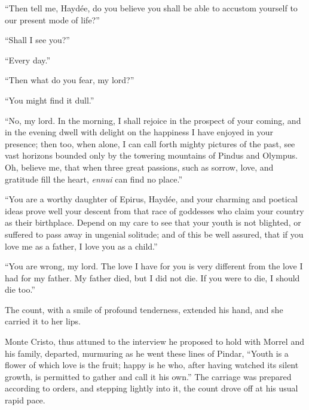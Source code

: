 “Then tell me, Haydée, do you believe you shall be able to accustom
yourself to our present mode of life?”

“Shall I see you?”

“Every day.”

“Then what do you fear, my lord?”

“You might find it dull.”

“No, my lord. In the morning, I shall rejoice in the prospect of your
coming, and in the evening dwell with delight on the happiness I have
enjoyed in your presence; then too, when alone, I can call forth mighty
pictures of the past, see vast horizons bounded only by the towering
mountains of Pindus and Olympus. Oh, believe me, that when three great
passions, such as sorrow, love, and gratitude fill the heart, \textit{ennui}
can find no place.”

“You are a worthy daughter of Epirus, Haydée, and your charming and
poetical ideas prove well your descent from that race of goddesses who
claim your country as their birthplace. Depend on my care to see that
your youth is not blighted, or suffered to pass away in ungenial
solitude; and of this be well assured, that if you love me as a father,
I love you as a child.”

“You are wrong, my lord. The love I have for you is very different from
the love I had for my father. My father died, but I did not die. If you
were to die, I should die too.”

The count, with a smile of profound tenderness, extended his hand, and
she carried it to her lips.

Monte Cristo, thus attuned to the interview he proposed to hold with
Morrel and his family, departed, murmuring as he went these lines of
Pindar, “Youth is a flower of which love is the fruit; happy is he who,
after having watched its silent growth, is permitted to gather and call
it his own.” The carriage was prepared according to orders, and
stepping lightly into it, the count drove off at his usual rapid pace.
